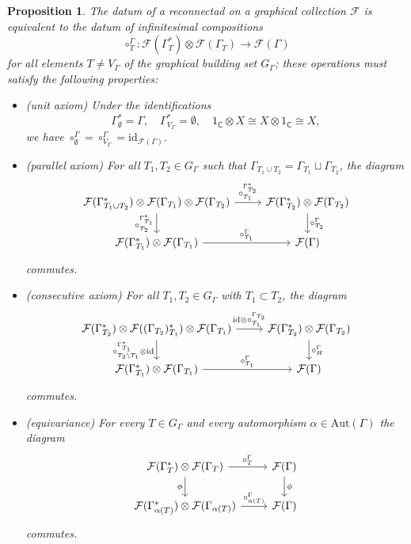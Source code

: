 \documentclass[11pt]{article}
\newtheorem{prop}[theo]{Proposition}
\theoremstyle{definition}
\numberwithin{equation}{section}
\newcommand\calF{\mathcal{F}}
\DeclareMathOperator{\sfC}{\mathsf{C}}
\begin{document}
\begin{prop}\label{prop:infini}
The datum of a reconnectad on a graphical collection $\calF$ is equivalent to the datum of infinitesimal compositions
 \[
\circ^\Gamma_T\colon\calF(\Gamma^*_T)\otimes\calF(\Gamma_T)\to\calF(\Gamma)
 \]
for all elements $T\ne V_\Gamma$ of the graphical building set $G_\Gamma$; these operations must satisfy the following properties:
\begin{itemize}
    \item (unit axiom) Under the identifications 
     \[
\Gamma^*_{\emptyset}=\Gamma,\quad \Gamma^*_{V_\Gamma}=\emptyset,\quad 1_{\sfC}\otimes X\cong X\otimes1_{\sfC}\cong X, 
     \]
    we have $\circ^\Gamma_\emptyset=\circ^\Gamma_{V_\Gamma}=\mathrm{id}_{\calF(\Gamma)}$.
    \item (parallel axiom) For all $T_1,T_2\in G_\Gamma$ such that $\Gamma_{T_1\cup T_2}=\Gamma_{T_1}\sqcup \Gamma_{T_2}$, the diagram
\[\begin{tikzcd}
\calF(\Gamma^*_{T_1\cup T_2}) \otimes \calF(\Gamma_{T_1}) \otimes \calF(\Gamma_{T_2}) \arrow{r}{\circ_{T_1}^{\Gamma^*_{T_2}}} \arrow[swap]{d}{\circ_{T_2}^{\Gamma^*_{T_1}}} & \calF(\Gamma^*_{T_2}) \otimes \calF(\Gamma_{T_2}) \arrow{d}{\circ_{T_2}^{\Gamma}} \\
\calF(\Gamma^*_{T_1}) \otimes \calF(\Gamma_{T_1})\arrow{r}{\circ_{T_1}^{\Gamma}} & \calF(\Gamma)
\end{tikzcd}
\]
    commutes. 
    \item (consecutive axiom) For all $T_1,T_2\in G_\Gamma$ with $T_1\subset T_2$, the diagram
\[\begin{tikzcd}
\calF(\Gamma^*_{T_2})\otimes \calF((\Gamma_{T_2})^*_{T_1}) \otimes \calF(\Gamma_{T_1}) \arrow{r}{\mathrm{id} \otimes \circ_{T_1}^{\Gamma_{T_2}}} \arrow[swap]{d}{\circ_{T_2\setminus T_1}^{\Gamma^*_{T_1}}\otimes \mathrm{id}} & \calF(\Gamma^*_{T_2}) \otimes\calF(\Gamma_{T_2}) \arrow{d}{\circ_H^{\Gamma}} \\
\calF(\Gamma^*_{T_1}) \otimes \calF(\Gamma_{T_1})  \arrow{r}{\circ_{T_1}^{\Gamma}} & \calF(\Gamma)
\end{tikzcd}
\]
    commutes.
    \item(equivariance) For every $T\in G_\Gamma$ and every automorphism $\alpha \in \mathrm{Aut}(\Gamma)$ the diagram 
\[\begin{tikzcd}
\calF(\Gamma^*_{T}) \otimes \calF(\Gamma_{T}) \arrow{r}{\circ_T^{\Gamma}} \arrow[swap]{d}{\phi} & \calF(\Gamma) \arrow{d}{\phi} \\
\calF(\Gamma^*_{\alpha(T)}) \otimes \calF(\Gamma_{\alpha(T)}) \arrow{r}{\circ_{\alpha(T)}^{\Gamma}} & \calF(\Gamma)
\end{tikzcd}
\]
    commutes.
\end{itemize}
\end{prop}
\end{document}
